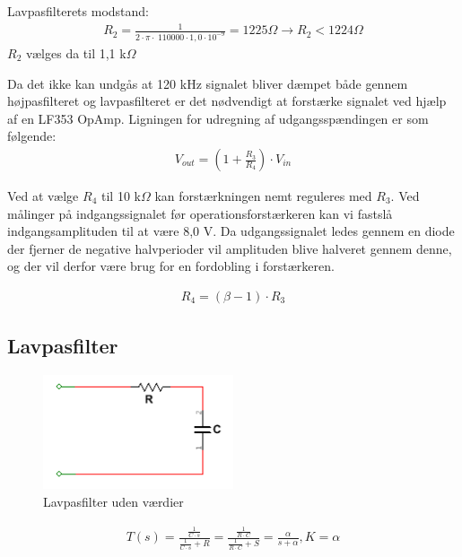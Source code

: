 Lavpasfilterets modstand:
\begin{align}
R_2 = \frac{1}{2 \cdot \pi \cdot \ 110000 \cdot 1,0 \cdot 10^{-9}} = 1225 \Omega
\rightarrow R_2 < 1224 \Omega
\end{align}
$R_2$ vælges da til 1,1 k$\Omega$

Da det ikke kan undgås at 120 kHz signalet bliver dæmpet både gennem højpasfilteret og lavpasfilteret er det nødvendigt at forstærke signalet ved hjælp af en LF353 OpAmp.
Ligningen for udregning af udgangsspændingen er som følgende:
\begin{align}
V_{out} = (1 + \frac{R_3}{R_4}) \cdot V_{in}
\end{align} 

Ved at vælge $R_4$ til 10 k$\Omega$ kan forstærkningen nemt reguleres med $R_3$.
Ved målinger på indgangssignalet før operationsforstærkeren kan vi fastslå indgangsamplituden til at være 8,0 V. Da udgangssignalet ledes gennem en diode der fjerner de negative halvperioder vil amplituden blive halveret gennem denne, og der vil derfor være brug for en fordobling i forstærkeren. 

\begin{align}
R_4 = (\beta - 1) \cdot R_3
\end{align} 

\newpage

\subsection{Lavpasfilter}

\begin{figure}[htbp]
	\centering
	\includegraphics[width=0.50\textwidth]{billeder/HWdesign/LP_UV.png}
	\caption{Lavpasfilter uden værdier}
	\label{fig:LP_UV}
\end{figure}


\begin{align}
\label{eq: LP_networkfunction}T(s) = \frac{\frac{1}{C \cdot s}}{\frac{1}{C \cdot s} + R} = \frac{\frac{1}{R \cdot C}}{\frac{1}{R \cdot C}+S}  = \frac{\alpha}{s + \alpha} , K= \alpha
\end{align}

